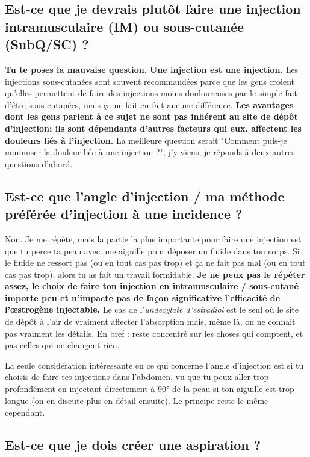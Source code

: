 \documentclass{article}
\begin{document}
\subsection{Est-ce que je devrais plutôt faire une injection intramusculaire (IM) ou  sous-cutanée (SubQ/SC) ?}

\textbf{Tu te poses la mauvaise question.} \textbf{Une injection est une injection.} Les injections sous-cutanées sont souvent recommandées parce que les gens croient qu'elles permettent de faire des injections moins douloureuses par le simple fait d'être sous-cutanées, mais ça ne fait en fait aucune différence. \textbf{Les avantages dont les gens parlent à ce sujet ne sont pas inhérent au site de dépôt d'injection; ils sont dépendants d'autres facteurs qui eux, affectent les douleurs liés à l'injection.} La meilleure question serait "Comment puis-je minimiser la douleur liée à une injection ?", j'y viens, je réponds à deux autres questions d'abord.

\subsection{Est-ce que l'angle d'injection / ma méthode préférée d'injection à une incidence ?}\label{5-9}

Non. Je me répète, mais la partie la plus importante pour faire une injection est que tu perce ta peau avec une aiguille pour déposer un fluide dans ton corps. Si le fluide ne ressort pas (ou en tout cas pas trop) et ça ne fait pas mal (ou en tout cas pas trop), alors tu as fait un travail formidable. \textbf{Je ne peux pas le répéter assez, le choix de faire ton injection en intramusculaire / sous-cutané importe peu et n'impacte pas de façon significative l'efficacité de l'œstrogène injectable. } Le cas de l'\textit{undecylate d'estradiol} est le seul où le site de dépôt à l'air de vraiment affecter l'absorption mais, même là, on ne connait pas vraiment les détails. En bref : reste concentré sur les choses qui comptent, et pas celles qui ne changent rien.

La seule considération intéressante en ce qui concerne l'angle d'injection est si tu choisis de faire tes injections dans l'abdomen, vu que tu peux aller trop profondément en injectant directement à 90° de la peau si ton aiguille est trop longue (on en discute plus en détail ensuite). Le principe reste le même cependant.

\subsection{Est-ce que je dois créer une aspiration ?}
\end{document}
